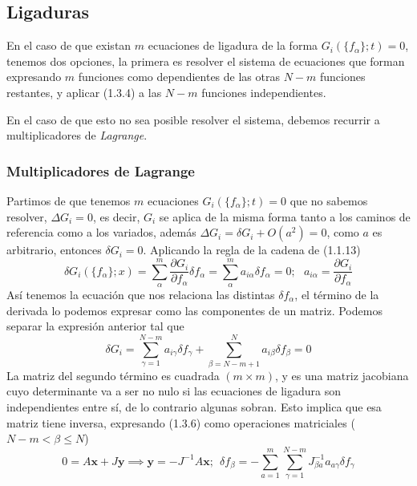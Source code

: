 \subsection{Ligaduras}
En el caso de que existan $m$ ecuaciones de ligadura de la forma $G_i(\{f_\alpha\};t)=0$, tenemos dos opciones, la primera es resolver el sistema de ecuaciones que forman expresando $m$ funciones como dependientes de las otras $N-m$ funciones restantes, y aplicar (1.3.4) a las $N-m$ funciones independientes.

En el caso de que esto no sea posible resolver el sistema, debemos recurrir a multiplicadores de \textit{Lagrange}.
\subsubsection{Multiplicadores de Lagrange}
Partimos de que tenemos $m$ ecuaciones $G_i(\{f_\alpha\};t)=0$ que no sabemos resolver, $\Delta G_i =0$, es decir, $G_i$ se aplica de la misma forma tanto a los caminos de referencia como a los variados, además $\Delta G_i = \delta G_i + O(a^2) = 0$, como $a$ es arbitrario, entonces $\delta G_i =0$. Aplicando la regla de la cadena de (1.1.13)
\begin{equation} \label{1.3.5}
    \delta G_i(\{f_\alpha\};x) = \sum_\alpha^m{\frac{\partial G_i}{\partial f_\alpha} \delta f_\alpha}=\sum_\alpha^m{a_{i\alpha} \delta f_\alpha}=0; \ \ \ a_{i\alpha} = \frac{\partial G_i}{\partial f_\alpha}
\end{equation} 
Así tenemos la ecuación que nos relaciona las distintas $\delta f_\alpha$, el término de la derivada lo podemos expresar como las componentes de un matriz. Podemos separar la expresión anterior tal que
\begin{equation} \label{1.3.6}
    \delta G_i= \sum_{\gamma=1}^{N-m}{a_{i\gamma} \delta f_\gamma} + \sum_{\beta=N-m+1}^{N}{a_{i\beta} \delta f_\beta} = 0
\end{equation} 
La matriz del segundo término es cuadrada $(m\times m)$, y es una matriz jacobiana cuyo determinante va a ser no nulo si las ecuaciones de ligadura son independientes entre sí, de lo contrario algunas sobran. Esto implica que esa matriz tiene inversa, expresando (1.3.6) como operaciones matriciales ($N-m < \beta \leq N$)
\begin{equation} \label{1.3.7}
    0= A\mathbf{x} + J\mathbf{y} \implies \mathbf{y}=-J^{-1}A\mathbf{x}; \ \ \delta f_\beta = -\sum_{a=1}^m{\sum_{\gamma =1}^{N-m}{J^{-1}_{\beta a}a_{a\gamma}\delta f_\gamma}}
\end{equation} 
